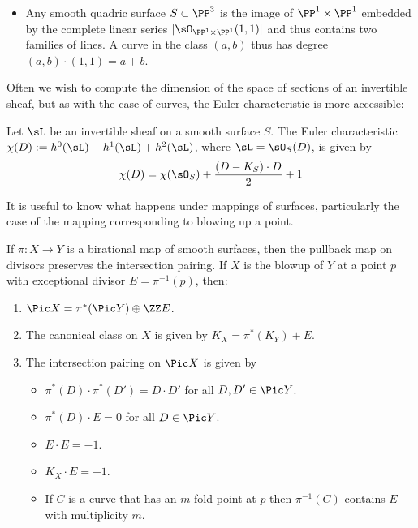 \begin{example}[Quadrics in $\PP^3$]
\begin{itemize}
\item Any smooth quadric surface $S\subset \PP^3$ is the 
image of $\PP^1\times \PP^1$ embedded by the complete linear series
$|\sO_{\PP^1\times \PP^1}(1,1)|$ and thus contains two families of lines. 
A curve in the class $(a,b)$ thus has degree $(a,b)\cdot(1,1) = a+b$. 
\end{itemize}
\end{example}

Often we wish to compute the dimension of the space of sections of an invertible sheaf, but
as with the case of curves, the Euler characteristic is more accessible:

\begin{theorem} Let $\sL$ be an invertible sheaf on a smooth surface $S$.
The Euler characteristic $\chi(D) := h^0(\sL)-h^1(\sL)+h^2(\sL)$, where $\sL = \sO_S(D)$, is given by
$$
\chi(D) = \chi(\sO_S) + \frac{(D-K_S)\cdot D}{2}+1
$$
\end{theorem}

It is useful to know what happens under mappings of surfaces, particularly the case of the mapping
corresponding to blowing up a point.

\begin{theorem}\label{divisor classes on blowup}
If $\pi: X \to Y$ is a birational map of smooth surfaces, then the pullback map on divisors
preserves the intersection pairing. If $X$ is the blowup of $Y$ at a point $p$ with exceptional
divisor $E = \pi^{-1}(p)$, then:

\begin{enumerate}
 \item $\Pic X =\pi^*(\Pic Y) \oplus \ZZ E$.
\item The canonical class on $X$ is given by $K_X = \pi^*(K_Y)+E$.
 \item The intersection pairing on $\Pic X$ is given by
 
\begin{itemize}
\item $\pi^*(D)\cdot\pi^*(D') = D\cdot D'$ for all $D,D'\in \Pic Y$.
\item $\pi^*(D)\cdot E = 0$ for all $D\in \Pic Y$.
 \item $E\cdot E = -1$.
 \item $K_X\cdot E = -1$.
 \item If $C$ is a curve that has an $m$-fold point at $p$ then $\pi^{-1}(C)$ contains $E$ with multiplicity $m$.
 \end{itemize}
\end{enumerate}
\end{theorem}

